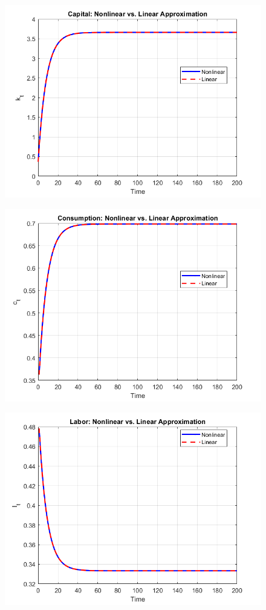 \documentclass[12pt]{article}
\begin{document}
\begin{figure}[H]
    \centering
        \includegraphics[width=\textwidth]{pset3_3d_fig1.png}
       
\end{figure}
\begin{figure}[H]
    \centering
        \includegraphics[width=\textwidth]{pset3_3d_fig2.png}
\end{figure}
\begin{figure}[H]
    \centering
        \includegraphics[width=\textwidth]{pset3_3d_fig3.png}

\end{figure}
\end{document}
